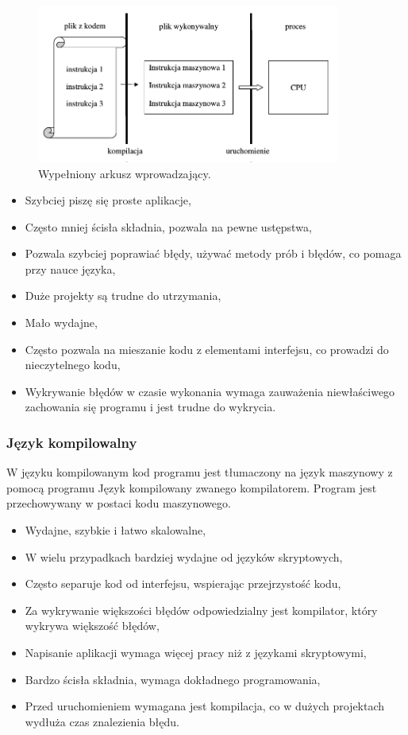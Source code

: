\documentclass{mwart}
\newcommand*\tick{\item[\Checkmark]}
\newcommand*\fail{\item[\XSolidBrush]}
\begin{document}
\begin{center}
  \begin{figure}
    \includegraphics[width=10cm]{diag2}
    \caption{Wypełniony arkusz wprowadzający.}
  \end{figure}
\end{center}

\begin{itemize}
    \tick Szybciej piszę się proste aplikacje,
    \tick Często mniej ścisła składnia, pozwala na pewne ustępstwa,
    \tick Pozwala szybciej poprawiać błędy, używać metody prób i błędów,
    co pomaga przy nauce języka,
    \fail Duże projekty są trudne do utrzymania,
    \fail Mało wydajne,
    \fail Często pozwala na mieszanie kodu z elementami interfejsu, co prowadzi 
    do nieczytelnego kodu,
    \fail Wykrywanie błędów w czasie wykonania wymaga zauważenia niewłaściwego zachowania się
    programu i jest trudne do wykrycia.
\end{itemize}

\subsubsection{Język kompilowalny}
W języku kompilowanym kod programu jest tłumaczony na język maszynowy z pomocą programu
Język kompilowany
zwanego kompilatorem. Program jest przechowywany w postaci kodu maszynowego.
\begin{itemize}
    \tick Wydajne, szybkie i łatwo skalowalne,
    \tick W wielu przypadkach bardziej wydajne od języków skryptowych,
    \tick Często separuje kod od interfejsu, wspierając przejrzystość kodu,
    \tick Za wykrywanie większości błędów odpowiedzialny jest kompilator, który wykrywa
    większość błędów,
    \fail Napisanie aplikacji wymaga więcej pracy niż z językami skryptowymi,
    \fail Bardzo ścisła składnia, wymaga dokładnego programowania,
    \fail Przed uruchomieniem wymagana jest kompilacja, co w dużych projektach wydłuża czas
    znalezienia błędu.
\end{itemize}
\end{document}
